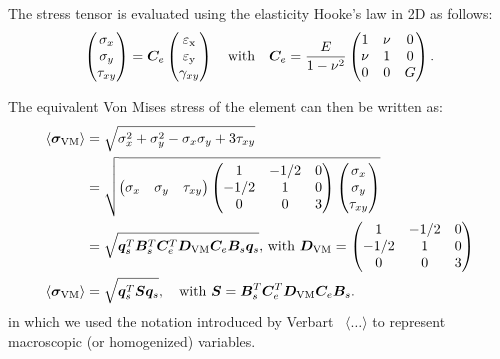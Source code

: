 The stress tensor is evaluated using the elasticity Hooke's law in 2D as follows: 
\begin{equation}
    \begin{pmatrix}
    \sigma_x \\
    \sigma_y \\
    \tau_{xy}
    \end{pmatrix}
    =\bm{C}_e
    \begin{pmatrix}
    \varepsilon_\text{x} \\
    \varepsilon_\text{y} \\
    \gamma_{xy}
    \end{pmatrix}
    \quad
    \text{with}
    \quad
    \bm{C}_e = \frac{E}{1-\nu^2}
    \begin{pmatrix}
    1   &   \nu &   0   \\
    \nu &   1   &   0   \\
    0   &   0   &   G
    \end{pmatrix}.
\end{equation}

The equivalent Von Mises stress of the element can then be written as:
\begin{align}
    \langle \bm{\sigma}_{\text{VM}} \rangle &= \sqrt{\sigma_x^2 + \sigma_y^2 - \sigma_x \sigma_y+3\tau_{xy}} \\
    &= \sqrt{
    \begin{pmatrix}
    \sigma_x & \sigma_y & \tau_{xy}
    \end{pmatrix}
    \begin{pmatrix}
    1       &   -1/2    &   0   \\
    -1/2    &   1       &   0   \\
    0       &   0       &   3
    \end{pmatrix}
    \begin{pmatrix}
    \sigma_x \\
    \sigma_y \\
    \tau_{xy}
    \end{pmatrix}} \\
    &= \sqrt{\bm{q}_s^T\bm{B}_s^T\bm{C}_e^T\bm{D}_{\text{VM}}\bm{C}_e\bm{B}_s\bm{q}_s}
    \textrm{,  with } \bm{D}_{\text{VM}} = 
    \begin{pmatrix}
    1       &   -1/2    &   0   \\
    -1/2    &   1       &   0   \\
    0       &   0       &   3
    \end{pmatrix} \\
    \langle \bm{\sigma}_{\text{VM}} \rangle &= \sqrt{\bm{q}_s^T\bm{S}\bm{q}_s}, \quad
    \textrm{with } \bm{S} = \bm{B}_s^T\bm{C}_e^T\bm{D}_{\text{VM}}\bm{C}_e\bm{B}_s.
    \label{eq:03_VM_calc}
\end{align}
in which we used the notation introduced by Verbart~ $\langle \dots \rangle$ to represent macroscopic (or homogenized) variables.
